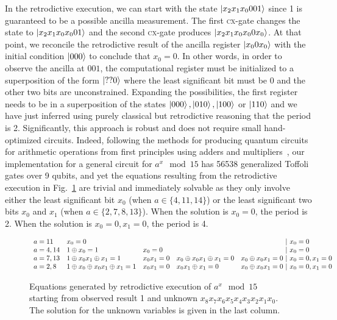 \documentclass{article}
\newcommand{\cx}{\textsc{cx}}
\begin{document}
In the retrodictive execution, we can start with the state
$\ket{x_2x_1x_0001}$ since 1 is guaranteed to be a possible
ancilla measurement. The first \cx-gate changes the state to
$\ket{x_2x_1x_0x_001}$ and the second \cx-gate produces
$\ket{x_2x_1x_0x_00x_0}$. At that point, we reconcile the
retrodictive result of the ancilla register $\ket{x_00x_0}$ with the
initial condition $\ket{000}$ to conclude that $x_0=0$. In other
words, in order to observe the ancilla at $001$, the computational
register must be initialized to a superposition of the form
$\ket{??0}$ where the least significant bit must be 0 and the other
two bits are unconstrained. Expanding the possibilities, the first
register needs to be in a superposition of the states $\ket{000},
\ket{010}, \ket{100}$ or $\ket{110}$ and we have just inferred using
purely classical but retrodictive reasoning that the period is
2. Significantly, this approach is robust and does not require small
hand-optimized circuits. Indeed, following the methods for producing
quantum circuits for arithmetic operations from first principles using
adders and multipliers~\cite{PhysRevA.54.147}, our implementation for
a general circuit for $a^x \mod{15}$ has 56538 generalized Toffoli
gates over 9 qubits, and yet the equations resulting from the
retrodictive execution in Fig.~\ref{fig:shor-eqs} are trivial and
immediately solvable as they only involve either the least significant
bit $x_0$ (when $a \in \{4,11,14\}$) or the least significant two bits
$x_0$ and $x_1$ (when $a \in \{2,7,8,13\}$). When the solution is
$x_0=0$, the period is 2. When the solution is $x_0=0,x_1=0$, the
period is 4.

\begin{figure}
\[\begin{array}{l@{\quad}llll@{~|~}l}
a=11 & x_0 = 0 &&&& x_0 = 0 \\
a=4,14 & 1 \oplus x_0 = 1 & x_0 = 0 &&
  & x_0 = 0 \\
a=7,13 & 1 \oplus x_0x_1 \oplus x_1 = 1 & x_0x_1 = 0 & x_0 \oplus x_0x_1 \oplus x_1 = 0 &  x_0 \oplus x_0x_1 = 0 & x_0=0, x_1=0 \\
a=2,8 & 1 \oplus x_0 \oplus x_0x_1 \oplus x_1 = 1 & x_0x_1 = 0 & x_0x_1 \oplus x_1 = 0 & x_0 \oplus x_0x_1 = 0  & x_0=0,x_1=0
\end{array}\]
\caption{\label{fig:shor-eqs}Equations generated by retrodictive
  execution of $a^x \mod{15}$ starting from observed result 1 and
  unknown $x_8x_7x_6x_5x_4x_3x_2x_1x_0$. The solution for the unknown
  variables is given in the last column.}
\end{figure}
\end{document}
